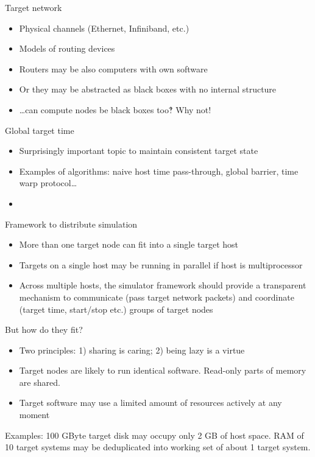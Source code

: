 \begin{frame}{Target network}

\begin{itemize}
\item Physical channels (Ethernet, Infiniband, etc.)
\item Models of routing devices
\item Routers may be also computers with own software
\item Or they may be abstracted as black boxes with no internal structure \pause
\item …can compute nodes be black boxes too‽ Why not!
\end{itemize}

\end{frame}


\begin{frame}{Global target time}

\begin{itemize}
\item Surprisingly important topic to maintain consistent target state 
\item Examples of algorithms: naive host time pass-through, global barrier, time warp protocol… 
\item 
\end{itemize}

\end{frame}

\begin{frame}{Framework to distribute simulation}

\begin{itemize}
\item More than one target node can fit into a single target host
\item Targets on a single host may be running in parallel if host is multiprocessor
\item Across multiple hosts, the simulator framework should provide a transparent mechanism to communicate (pass target network packets) and coordinate (target time, start/stop etc.) groups of target nodes
\end{itemize}

\end{frame}

\begin{frame}{But how do they fit?}

\begin{itemize}
\item Two principles: 1) sharing is caring; 2) being lazy is a virtue
\item Target nodes are likely to run identical software. Read-only parts of memory are shared.
\item Target software may use a limited amount of resources actively at any moment
\end{itemize}

Examples: 100 GByte target disk may occupy only 2 GB of host space. RAM of 10 target systems  may be deduplicated into working set of about 1 target system.

\end{frame}


